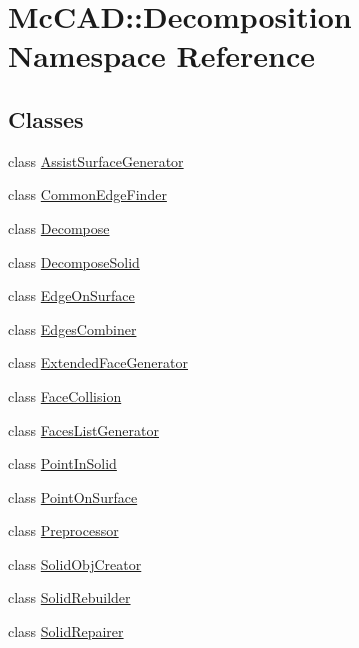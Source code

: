 \hypertarget{namespaceMcCAD_1_1Decomposition}{}\section{Mc\+C\+AD\+:\+:Decomposition Namespace Reference}
\label{namespaceMcCAD_1_1Decomposition}
\subsection*{Classes}
\begin{DoxyCompactItemize}
\item 
class \hyperlink{classMcCAD_1_1Decomposition_1_1AssistSurfaceGenerator}{Assist\+Surface\+Generator}
\item 
class \hyperlink{classMcCAD_1_1Decomposition_1_1CommonEdgeFinder}{Common\+Edge\+Finder}
\item 
class \hyperlink{classMcCAD_1_1Decomposition_1_1Decompose}{Decompose}
\item 
class \hyperlink{classMcCAD_1_1Decomposition_1_1DecomposeSolid}{Decompose\+Solid}
\item 
class \hyperlink{classMcCAD_1_1Decomposition_1_1EdgeOnSurface}{Edge\+On\+Surface}
\item 
class \hyperlink{classMcCAD_1_1Decomposition_1_1EdgesCombiner}{Edges\+Combiner}
\item 
class \hyperlink{classMcCAD_1_1Decomposition_1_1ExtendedFaceGenerator}{Extended\+Face\+Generator}
\item 
class \hyperlink{classMcCAD_1_1Decomposition_1_1FaceCollision}{Face\+Collision}
\item 
class \hyperlink{classMcCAD_1_1Decomposition_1_1FacesListGenerator}{Faces\+List\+Generator}
\item 
class \hyperlink{classMcCAD_1_1Decomposition_1_1PointInSolid}{Point\+In\+Solid}
\item 
class \hyperlink{classMcCAD_1_1Decomposition_1_1PointOnSurface}{Point\+On\+Surface}
\item 
class \hyperlink{classMcCAD_1_1Decomposition_1_1Preprocessor}{Preprocessor}
\item 
class \hyperlink{classMcCAD_1_1Decomposition_1_1SolidObjCreator}{Solid\+Obj\+Creator}
\item 
class \hyperlink{classMcCAD_1_1Decomposition_1_1SolidRebuilder}{Solid\+Rebuilder}
\item 
class \hyperlink{classMcCAD_1_1Decomposition_1_1SolidRepairer}{Solid\+Repairer}
\item 

\end{DoxyCompactItemize}
